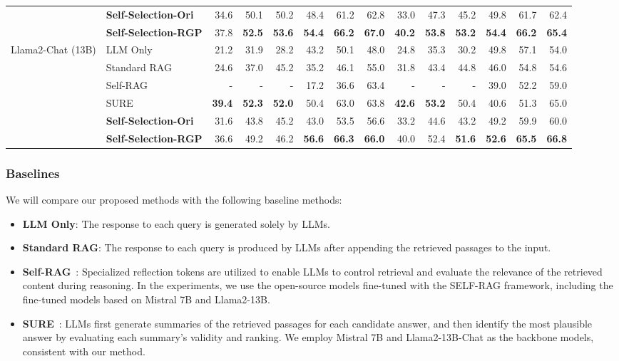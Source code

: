 \begin{table*}[t]
\begin{tabular}{llrrrrrrrrrrrr}
          & \textbf{Self-Selection-Ori} & 34.6  & 50.1  & 50.2  & 48.4  & 61.2  & 62.8  & 33.0  & 47.3  & 45.2  & 49.8  & 61.7  & 62.4 \\
          & \textbf{Self-Selection-RGP} & 37.8  & \textbf{52.5} & \textbf{53.6} & \textbf{54.4} & \textbf{66.2} & \textbf{67.0} & \textbf{40.2} & \textbf{53.8} & \textbf{53.2} & \textbf{54.4} & \textbf{66.2} & \textbf{65.4} \\
    \midrule
    \multirow{6}[2]{*}{Llama2-Chat (13B)} & LLM Only & 21.2  & 31.9  & 28.2  & 43.2  & 50.1  & 48.0  & 24.8  & 35.3  & 30.2  & 49.8  & 57.1  & 54.0 \\
          & Standard RAG  & 24.6  & 37.0  & 45.2  & 35.2  & 46.1  & 55.0  & 31.8  & 43.4  & 44.8  & 46.0  & 54.8  & 54.6 \\
          & Self-RAG & -     & -     & -     & 17.2  & 36.6  & 63.4  & -     & -     & -     & 39.0  & 52.2  & 59.0 \\
          & SURE  & \textbf{39.4} & \textbf{52.3} & \textbf{52.0} & 50.4  & 63.0  & 63.8  & \textbf{42.6} & \textbf{53.2} & 50.4  & 40.6  & 51.3  & 65.0 \\
          & \textbf{Self-Selection-Ori} & 31.6  & 43.8  & 45.2  & 43.0  & 53.5  & 56.6  & 33.2  & 44.6  & 43.2  & 49.2  & 59.9  & 60.0 \\
          & \textbf{Self-Selection-RGP} & 36.6  & 49.2  & 46.2  & \textbf{56.6} & \textbf{66.3} & \textbf{66.0} & 40.0  & 52.4  & \textbf{51.6} & \textbf{52.6} & \textbf{65.5} & \textbf{66.8} \\
    \bottomrule
    \end{tabular}%
  \label{tab:main}%
\end{table*}%
\subsubsection{\textbf{Baselines}}
We will compare our proposed methods with the following baseline methods:
\begin{itemize}[leftmargin=*,nosep]
    \item \textbf{LLM Only}: The response to each query is generated solely by LLMs. 
    \item \textbf{Standard RAG}: The response to each query is produced by LLMs after appending the retrieved passages to the input.
    \item \textbf{Self-RAG}~\cite{asai2024selfrag}: Specialized reflection tokens are utilized to enable LLMs to control retrieval and evaluate the relevance of the retrieved content during reasoning. In the experiments, we use the open-source models fine-tuned with the SELF-RAG framework, including the fine-tuned models based on Mistral 7B and Llama2-13B\cite{asai2024selfrag,SciPhi-AI2024}.
    \item \textbf{SURE}~\cite{kim2024sure}: LLMs first generate summaries of the retrieved passages for each candidate answer, and then identify the most plausible answer by evaluating each summary’s validity and ranking. We employ Mistral 7B  and Llama2-13B-Chat \cite{touvron2023llama2openfoundation} as the backbone models, consistent with our method.
\end{itemize}

